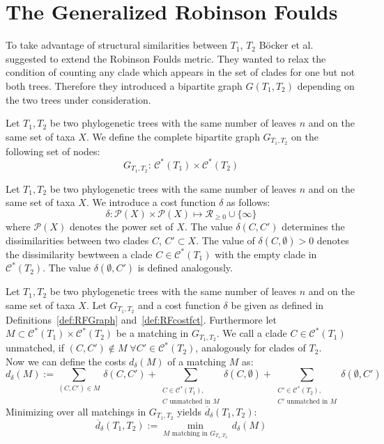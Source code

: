 \section{The Generalized Robinson Foulds}
To take advantage of structural similarities between $T_1$, $T_2$ Böcker et al.~\cite{Boe} suggested to extend the Robinson Foulds metric. They wanted to relax the condition of counting any clade which appears in the set of clades for one but not both trees. Therefore they introduced a bipartite graph $G(T_1, T_2)$ depending on the two trees under consideration. 
\begin{defin} \label{def:RFGraph}
Let $T_1, T_2$ be two phylogenetic trees with the same number of leaves $n$ and on the same set of taxa $X$. We define the complete bipartite graph $G_{T_1,T_2}$ on the following set of nodes:
$$G_{T_1,T_2}: \, \mathcal{C}^*(T_1) \times \mathcal{C}^*(T_2)$$
\end{defin}
\begin{defin}\label{def:RFcostfct}
Let $T_1, T_2$ be two phylogenetic trees with the same number of leaves $n$ and on the same set of taxa $X$. We introduce a cost function $\delta$ as follows:
$$\delta: \mathcal{P}(X) \times \mathcal{P}(X) \mapsto \mathcal{R}_{\geq 0} \cup \{\infty\}$$
where $\mathcal{P}(X)$ denotes the power set of $X$. The value $\delta(C,C')$ determines the dissimilarities between two clades $C$, $C' \subset X$. The value of $\delta(C, \emptyset) > 0$ denotes the dissimilarity bewtween a clade $C \in \mathcal{C}^*(T_1)$ with the empty clade in $\mathcal{C}^*(T_2)$. The value $\delta(\emptyset, C')$ is defined analogously.
\end{defin}
\begin{defin}\label{def:preRFdist}
Let $T_1, T_2$ be two phylogenetic trees with the same number of leaves $n$ and on the same set of taxa $X$. Let $G_{T_1,T_2}$ and a cost function $\delta$ be given as defined in Definitions~\ref{def:RFGraph} and~\ref{def:RFcostfct}. Furthermore let $M \subset \mathcal{C}^*(T_1) \times \mathcal{C}^*(T_2)$ be a matching in $G_{T_1,T_2}$. 
We call a clade $C \in \mathcal{C}^*(T_1)$ unmatched, if $(C, C') \notin M \; \forall C' \in \mathcal{C}^*(T_2)$, analogously for clades of $T_2$.\\
Now we can define the costs $d_{\delta}(M)$ of a matching $M$ as:
$$d_{\delta}(M) := \sum_{(C, C') \in M} \, \delta(C,C') + \sum_{\substack{C \in \mathcal{C}^*(T_1),\\ C\text{ unmatched in }M}} \delta(C, \emptyset) + \sum_{\substack{C' \in \mathcal{C}^*(T_2),\\C'\text{ unmatched in }M}} \delta(\emptyset, C')$$
Minimizing over all matchings in $G_{T_1,T_2}$ yields $\overline{d}_{\delta}(T_1,T_2)$:
$$\overline{d}_{\delta}(T_1,T_2) := \min_{M \text{ matching in }G_{T_1,T_2}} \, d_{\delta}(M)$$
\end{defin}
